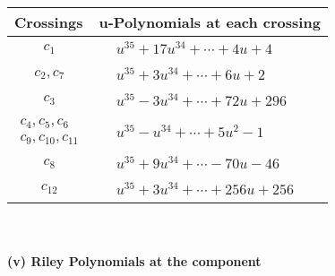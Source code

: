 \documentclass[1p]{elsarticle_modified}
\theoremstyle{definition}
\begin{document}
\begin{tabular}{m{50pt}|m{274pt}}
Crossings & \hspace{64pt}u-Polynomials at each crossing \\
\hline $$\begin{aligned}c_{1}\end{aligned}$$&$\begin{aligned}
&u^{35}+17 u^{34}+\cdots+4 u+4
\end{aligned}$\\
\hline $$\begin{aligned}c_{2},c_{7}\end{aligned}$$&$\begin{aligned}
&u^{35}+3 u^{34}+\cdots+6 u+2
\end{aligned}$\\
\hline $$\begin{aligned}c_{3}\end{aligned}$$&$\begin{aligned}
&u^{35}-3 u^{34}+\cdots+72 u+296
\end{aligned}$\\
\hline $$\begin{aligned}c_{4},c_{5},c_{6}\\c_{9},c_{10},c_{11}\end{aligned}$$&$\begin{aligned}
&u^{35}- u^{34}+\cdots+5 u^2-1
\end{aligned}$\\
\hline $$\begin{aligned}c_{8}\end{aligned}$$&$\begin{aligned}
&u^{35}+9 u^{34}+\cdots-70 u-46
\end{aligned}$\\
\hline $$\begin{aligned}c_{12}\end{aligned}$$&$\begin{aligned}
&u^{35}+3 u^{34}+\cdots+256 u+256
\end{aligned}$\\
\hline
\end{tabular}\\~\\
\newpage\renewcommand{\arraystretch}{1}
\flushleft \textbf{(v) Riley Polynomials at the component}\newline \\
\end{document}

